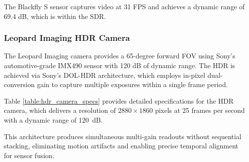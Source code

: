 \documentclass{erauthesis}
\begin{document}
The Blackfly S sensor captures video at 31 \ac{FPS} and achieves a dynamic range of 69.4 dB, which is within the \ac{SDR}.

\subsubsection{Leopard Imaging HDR Camera} \label{sensors_HDR}

The Leopard Imaging camera provides a 65-degree forward \ac{FOV} using Sony’s automotive-grade IMX490 sensor with 120 dB of dynamic range.
The \ac{HDR} is achieved via Sony’s \ac{DOL-HDR} architecture, which employs in-pixel dual-conversion gain to capture multiple exposures within a single frame period.

Table \ref{table:hdr_camera_specs} provides detailed specifications for the HDR camera, which delivers a resolution of $2880 \times 1860$ pixels at 25 frames per second with a dynamic range of 120~dB.%


This architecture produces simultaneous multi-gain readouts without sequential stacking, eliminating motion artifacts and enabling precise temporal alignment for sensor fusion.
\end{document}
